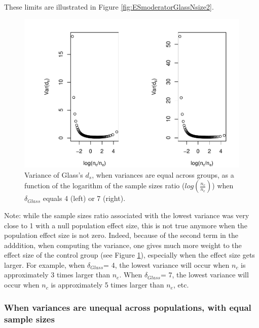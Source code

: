 \documentclass[
  english,
  man]{apa6}
\begin{document}
These limits are illustrated in Figure \ref{fig:ESmoderatorGlassNsize2}.

\begin{figure}
\centering
\includegraphics{Theoretical-Variance-of-all-estimators-as-a-function-of-population-parameters_files/figure-latex/varglasshomNratiobis2-1.pdf}
\caption{\label{fig:varglasshomNratiobis2}Variance of Glass's \(d_s\), when variances are equal across groups, as a function of the logarithm of the sample sizes ratio (\(log\left(\frac{n_c}{n_e} \right)\)) when \(\delta_{Glass}\) equals 4 (left) or 7 (right).}
\end{figure}

Note: while the sample sizes ratio associated with the lowest variance was very close to 1 with a null population effect size, this is not true anymore when the population effect size is not zero. Indeed, because of the second term in the adddition, when computing the variance, one gives much more weight to the effect size of the control group (see Figure \ref{fig:varglasshomNratiobis2}), especially when the effect size gets larger. For example, when \(\delta_{Glass}\)= 4, the lowest variance will occur when \(n_c\) is approximately 3 times larger than \(n_e\). When \(\delta_{Glass}\)= 7, the lowest variance will occur when \(n_c\) is approximately 5 times larger than \(n_e\), etc.

\hypertarget{when-variances-are-unequal-across-populations-with-equal-sample-sizes}{%
\subsubsection{When variances are unequal across populations, with equal sample sizes}\label{when-variances-are-unequal-across-populations-with-equal-sample-sizes}}
\end{document}
